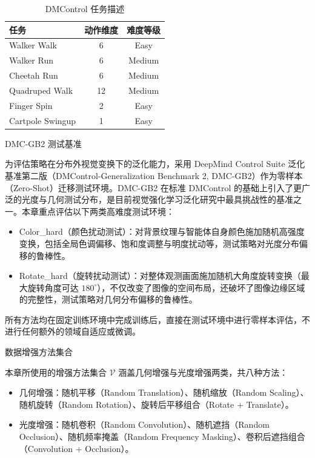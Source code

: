 \begin{table}[htbp]
    \centering
    \caption{DMControl 任务描述}
    \label{tab:tasks}
    \begin{tabular}{lcc}
        \hline
        任务 & 动作维度 & 难度等级 \\
        \hline
        Walker Walk     & 6  & Easy \\
        Walker Run      & 6  & Medium \\
        Cheetah Run     & 6  & Medium \\
        Quadruped Walk  & 12 & Medium \\
        Finger Spin     & 2  & Easy \\
        Cartpole Swingup & 1 & Easy \\
        \hline
    \end{tabular}
\end{table}

DMC-GB2 测试基准

为评估策略在分布外视觉变换下的泛化能力，采用 DeepMind Control Suite 泛化基准第二版（DMControl-Generalization Benchmark 2, DMC-GB2）\cite{hansen2021generalization}作为零样本（Zero-Shot）迁移测试环境。DMC-GB2 在标准 DMControl 的基础上引入了更广泛的光度与几何测试分布，是目前视觉强化学习泛化研究中最具挑战性的基准之一。本章重点评估以下两类高难度测试环境：
\begin{itemize}
    \item Color\_hard（颜色扰动测试）：对背景纹理与智能体自身颜色施加随机高强度变换，包括全局色调偏移、饱和度调整与明度扰动等，测试策略对光度分布偏移的鲁棒性。
    \item Rotate\_hard（旋转扰动测试）：对整体观测画面施加随机大角度旋转变换（最大旋转角度可达 $180^\circ$），不仅改变了图像的空间布局，还破坏了图像边缘区域的完整性，测试策略对几何分布偏移的鲁棒性。
\end{itemize}

所有方法均在固定训练环境中完成训练后，直接在测试环境中进行零样本评估，不进行任何额外的领域自适应或微调。

数据增强方法集合

本章所使用的增强方法集合 $\mathcal{V}$ 涵盖几何增强与光度增强两类，共八种方法：
\begin{itemize}
    \item 几何增强：随机平移（Random Translation）\cite{laskin2020reinforcement}、随机缩放（Random Scaling）、随机旋转（Random Rotation）、旋转后平移组合（Rotate + Translate）。
    \item 光度增强：随机卷积（Random Convolution）\cite{lee2019network}、随机遮挡（Random Occlusion）、随机频率掩盖（Random Frequency Masking）、卷积后遮挡组合（Convolution + Occlusion）。
\end{itemize}

